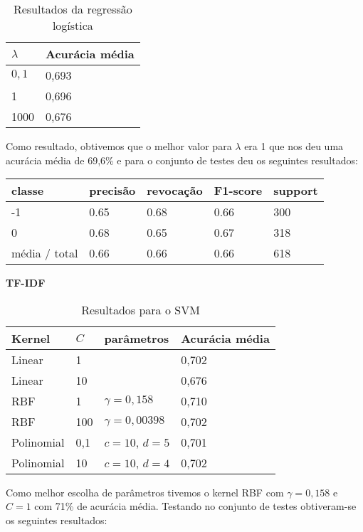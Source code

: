 \begin{table}[H]
	\centering
	\caption{Resultados da regressão logística}
	\begin{tabular}{l l}
		\hline
		$\lambda$ & Acurácia média \\
		\hline
		$0,1$ & 0,693 \\
		\hline
		1 & 0,696 \\
		\hline
		1000 & 0,676 \\
	\end{tabular}
\end{table}

Como resultado, obtivemos que o melhor valor para $\lambda$ era 1 que nos deu uma acurácia
média de 69,6\% e para o conjunto de testes deu os seguintes resultados:

\begin{table}[H]
	\centering
		\begin{tabular}{l | l | l | l | l}
		\hline
		classe  	&	precisão  &  revocação &  F1-score &  support \\
		\hline
		 -1    &   0.65   &   0.68   &   0.66   &    300 \\
		 \hline
          0    &   0.68   &   0.65   &   0.67   &    318 \\
		\hline
		média / total   &    0.66   &   0.66   &   0.66   &    618 \\
		\hline
	\end{tabular}
\end{table}


\textbf{TF-IDF}

\begin{table}[H]
	\centering
	\caption{Resultados para o SVM}
	\begin{tabular}{l l l l}
		\hline
		Kernel & $C$ & parâmetros & Acurácia média \\
		\hline
		Linear & 1 & & 0,702 \\
		\hline
		Linear & 10 & & 0,676 \\
		\hline
		RBF & 1 & $\gamma = 0,158$ & 0,710 \\
		\hline
		RBF & 100 & $\gamma = 0,00398$ & 0,702 \\
		\hline
		Polinomial & 0,1 & $c = 10$, $d = 5$ & 0,701 \\
		\hline
		Polinomial & 10 & $c = 10$, $d = 4$ & 0,702 \\
		\hline
	\end{tabular}
\end{table}

Como melhor escolha de parâmetros tivemos o kernel RBF com $\gamma = 0,158$ e $C = 1$ com 71\% de
acurácia média. Testando no conjunto de testes obtiveram-se os seguintes resultados:

